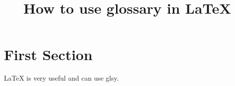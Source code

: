 \documentclass{article}
\title{How to use glossary in LaTeX}
\author{ }
\date{ }
\begin{document}
\maketitle
\tableofcontents

\section{First Section} 
LaTeX is very useful and can use \gls{glsy}. 
 
 
\printglossary
 
\end{document}
